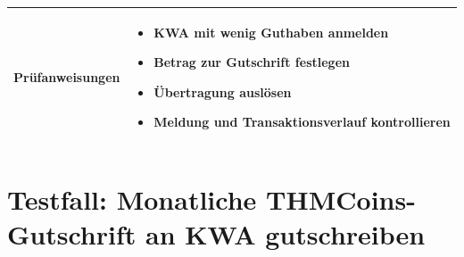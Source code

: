 \documentclass[a4paper,12pt]{article}
\begin{document}
\begin{center}
\begin{tabular}{|p{5cm}|p{10.5cm}|}
\textbf{Prüfanweisungen} &
\begin{minipage}[t]{10.5cm}
\begin{itemize}[leftmargin=*]
  \item KWA mit wenig Guthaben anmelden
  \item Betrag zur Gutschrift festlegen
  \item Übertragung auslösen
  \item Meldung und Transaktionsverlauf kontrollieren
\end{itemize}
\vspace{0.2cm}
\end{minipage} \\
\hline
\end{tabular}
\end{center}

\vspace{1.5cm}

\section*{Testfall: Monatliche THMCoins-Gutschrift an KWA gutschreiben}
\end{document}
